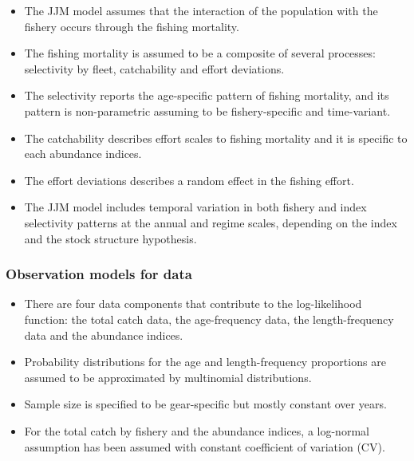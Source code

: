 \documentclass{article}
\begin{document}
\begin{itemize}

\item The JJM model assumes that the interaction of the population with the fishery occurs through the fishing mortality.
    
\item The fishing mortality is assumed to be a composite of several processes: selectivity by fleet, catchability and effort deviations.

\item The selectivity reports the age-specific pattern of fishing mortality, and its pattern is non-parametric assuming to be fishery-specific and time-variant.

\item The catchability describes effort scales to fishing mortality and it is specific to each abundance indices.
    
\item The effort deviations describes a random effect in the fishing effort.

\item The JJM model includes temporal variation in both fishery and index selectivity patterns at the annual and regime scales, depending on the index and the stock structure hypothesis.
\end{itemize}

\subsubsection{Observation models for data}

\begin{itemize}

\item There are four data components that contribute to the log-likelihood function: the total catch data, the age-frequency data, the length-frequency data and the abundance indices.

\item Probability distributions for the age and length-frequency proportions are assumed to be approximated by multinomial distributions.

\item Sample size is specified to be gear-specific but mostly constant over years.

\item For the total catch by fishery and the abundance indices, a log-normal assumption has been assumed with constant coefficient of variation (CV).

\end{itemize}
\end{document}
